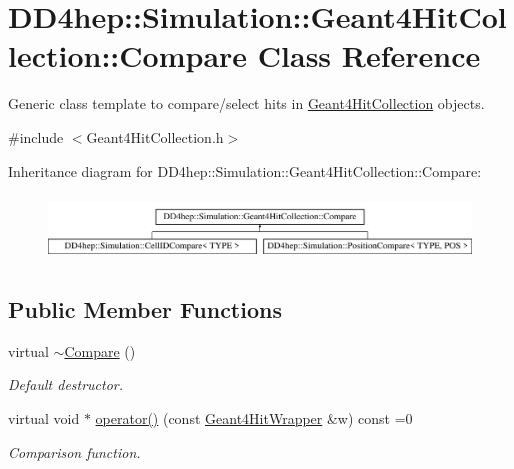 \hypertarget{class_d_d4hep_1_1_simulation_1_1_geant4_hit_collection_1_1_compare}{}\section{D\+D4hep\+:\+:Simulation\+:\+:Geant4\+Hit\+Collection\+:\+:Compare Class Reference}
\label{class_d_d4hep_1_1_simulation_1_1_geant4_hit_collection_1_1_compare}


Generic class template to compare/select hits in \hyperlink{class_d_d4hep_1_1_simulation_1_1_geant4_hit_collection}{Geant4\+Hit\+Collection} objects.  




{\ttfamily \#include $<$Geant4\+Hit\+Collection.\+h$>$}

Inheritance diagram for D\+D4hep\+:\+:Simulation\+:\+:Geant4\+Hit\+Collection\+:\+:Compare\+:\begin{figure}[H]
\begin{center}
\leavevmode
\includegraphics[height=1.744548cm]{class_d_d4hep_1_1_simulation_1_1_geant4_hit_collection_1_1_compare}
\end{center}
\end{figure}
\subsection*{Public Member Functions}
\begin{DoxyCompactItemize}
\item 
virtual \hyperlink{class_d_d4hep_1_1_simulation_1_1_geant4_hit_collection_1_1_compare_a564c52106afdec9d7721a4089ada4fb9}{$\sim$\+Compare} ()
\begin{DoxyCompactList}\small\item\em Default destructor. \end{DoxyCompactList}\item 
virtual void $\ast$ \hyperlink{class_d_d4hep_1_1_simulation_1_1_geant4_hit_collection_1_1_compare_ad81521e6dfc48aaee6d2dd9464a7afeb}{operator()} (const \hyperlink{class_d_d4hep_1_1_simulation_1_1_geant4_hit_wrapper}{Geant4\+Hit\+Wrapper} \&w) const =0
\begin{DoxyCompactList}\small\item\em Comparison function. \end{DoxyCompactList}\end{DoxyCompactItemize}


